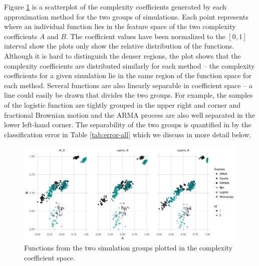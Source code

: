 Figure \ref{fig:feature-space} is a scatterplot of the complexity coefficients generated by each approximation method for the two groups of simulations. Each point represents where an individual function lies in the feature space of the two complexity coefficients $A$ and $B$. The coefficient values have been normalized to the $[0,1]$ interval show the plots only show the relative distribution of the functions. Although it is hard to distinguish the denser regions, the plot shows that the complexity coefficients are distributed
similarly for each method -- the complexity coefficients for a given simulation lie in the same region of the function space for each method. Several functions are also linearly separable in coefficient space -- a line could easily be drawn that divides the two groups. For example, the samples of the logistic function are tightly grouped in the upper right and corner and fractional Brownian motion and the ARMA process are also well separated in the lower left-hand corner. The separability of the two groups is quantified in by the classification error in Table \ref{tab:error-all} which we discuss in more detail below.

\begin{figure}[!htbp]
  \begin{center}
  \includegraphics[width = \textwidth, keepaspectratio]{./figs/ecomplex_approx-feature-space.pdf}
  \end{center}
  \caption{Functions from the two simulation groups plotted in the 
  complexity coefficient space.}
  \label{fig:feature-space} 
\end{figure}

